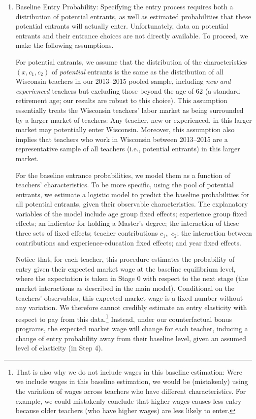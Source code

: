 \documentclass[notitlepage,12pt]{article}%
\begin{document}
\begin{enumerate}
\item Baseline Entry Probability: Specifying the entry process requires both a
distribution of potential entrants, as well as estimated probabilities that
these potential entrants will actually enter. Unfortunately, data on potential
entrants and their entrance choices are not directly available. To proceed, we
make the following assumptions.

For potential entrants, we assume that the distribution of the characteristics
$\left(  x,c_{1},c_{2}\right)  $ of \emph{potential} entrants is the same as
the distribution of all Wisconsin teachers in our 2013--2015 pooled sample,
including \emph{new and experienced} teachers but excluding those beyond the
age of 62 (a standard retirement age; our results are robust to this choice).
This assumption essentially treats the Wisconsin teachers' labor market as
being surrounded by a larger market of teachers: Any teacher, new or
experienced, in this larger market may potentially enter Wisconsin. Moreover,
this assumption also implies that teachers who work in Wisconsin between
2013--2015 are a representative sample of all teachers (i.e., potential
entrants) in this larger market.

For the baseline entrance probabilities, we model them as a function of
teachers' characteristics. To be more specific, using the pool of potential
entrants, we estimate a logistic model to predict the baseline probabilities
for all potential entrants, given their observable characteristics. The
explanatory variables of the model include age group fixed effects; experience
group fixed effects; an indicator for holding a Master's degree; the
interaction of these three sets of fixed effects; teacher contributions
$c_{1},$ $c_{2}$; the interaction between contributions and
experience-education fixed effects; and year fixed effects.

Notice that, for each teacher, this procedure estimates the probability of
entry given their expected market wage at the baseline equilibrium level,
where the expectation is taken in Stage 0 with respect to the next stage (the
market interactions as described in the main model). Conditional on the
teachers' observables, this expected market wage is a fixed number without any
variation. We therefore cannot credibly estimate an entry elasticity with
respect to pay from this data.\footnote{That is also why we do not include
wages in this baseline estimation: Were we include wages in this baseline
estimation, we would be (mistakenly) using the variation of wages across
teachers who have different characteristics. For example, we could mistakenly
conclude that higher wages causes less entry because older teachers (who have
higher wages) are less likely to enter.} Instead, under our counterfactual
bonus programs, the expected market wage will change for each teacher,
inducing a change of entry probability away from their baseline level, given
an assumed level of elasticity (in Step 4).


\end{enumerate}
\end{document}
